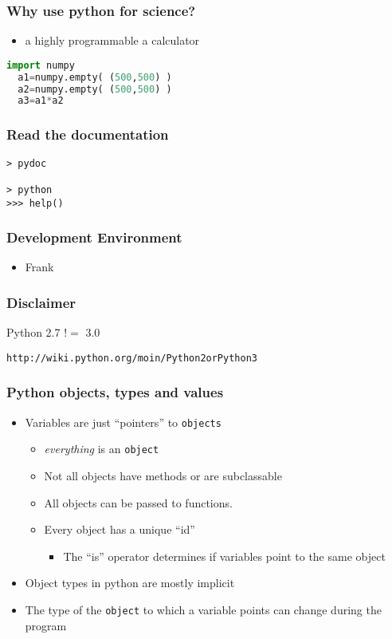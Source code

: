 \documentclass[xcolor=table,10pt,final]{beamer}
\begin{document}
\begin{frame}[fragile]
  \frametitle{Why use python for science?}
  \begin{itemize}
    \item a highly programmable a calculator
  \end{itemize}
  \begin{lstlisting}[language=python]
  import numpy
  a1=numpy.empty( (500,500) )
  a2=numpy.empty( (500,500) )
  a3=a1*a2
\end{lstlisting}
\end{frame}


\begin{frame}[fragile]
  \frametitle{Read the documentation}
  \begin{verbatim}
> pydoc

> python
>>> help()
\end{verbatim}
\end{frame}


\begin{frame}
  \frametitle{Development Environment}
  \begin{itemize}
    \item Frank
  \end{itemize}
\end{frame}


\begin{frame}[fragile]
  \frametitle{Disclaimer}
  Python 2.7 $!=$ 3.0
  \vskip1cm
  \begin{verbatim}
http://wiki.python.org/moin/Python2orPython3
\end{verbatim}
\end{frame}

\begin{frame}[fragile]
  \frametitle{Python objects, types and values}
  \begin{itemize}
    \item Variables are just ``pointers'' to {\tt objects}
      \begin{itemize}
        \item {\it everything} is an {\tt object}
        \item Not all objects have methods or are subclassable
        \item All objects can be passed to functions.
        \item Every object has a unique ``id''
          \begin{itemize}
            \item The ``is'' operator determines if variables point to the same object
          \end{itemize}
      \end{itemize}
    \item Object types in python are mostly implicit
    \item The type of the {\tt object} to which a variable points can change during the program
  \end{itemize}
\end{frame}
\end{document}
